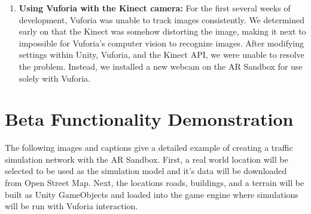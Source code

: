 \documentclass[letterpaper, 10pt, onecolumn, draftclsnofoot]{IEEEtran}
\begin{document}
\begin{enumerate}[label=]
        \item{\textbf{Using Vuforia with the Kinect camera:}} 
            For the first several weeks of development, Vuforia was unable to track images consistently. We determined early on that the Kinect was somehow distorting the image, making it next to impossible for Vuforia's computer vision to recognize images. After modifying settings within Unity, Vuforia, and the Kinect API, we were unable to resolve the problem. Instead, we installed a new webcam on the AR Sandbox for use solely with Vuforia.
    \end{enumerate}

\section{Beta Functionality Demonstration}
    The following images and captions give a detailed example of creating a traffic simulation network with the AR Sandbox. First, a real world location will be selected to be used as the simulation model and it's data will be downloaded from Open Street Map. Next, the locations roads, buildings, and a terrain will be built as Unity GameObjects and loaded into the game engine where simulations will be run with Vuforia interaction.
\end{document}
